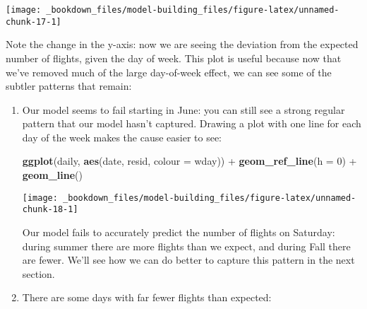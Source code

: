 \documentclass[]{book}
\newenvironment{Shaded}{\begin{snugshade}}{\end{snugshade}}
\newcommand{\KeywordTok}[1]{\textcolor[rgb]{0.13,0.29,0.53}{\textbf{{#1}}}}
\newcommand{\DataTypeTok}[1]{\textcolor[rgb]{0.13,0.29,0.53}{{#1}}}
\newcommand{\DecValTok}[1]{\textcolor[rgb]{0.00,0.00,0.81}{{#1}}}
\newcommand{\StringTok}[1]{\textcolor[rgb]{0.31,0.60,0.02}{{#1}}}
\newcommand{\CommentTok}[1]{\textcolor[rgb]{0.56,0.35,0.01}{\textit{{#1}}}}
\newcommand{\NormalTok}[1]{{#1}}
\begin{document}
\begin{center}\texttt{[image: \_bookdown\_files/model-building\_files/figure-latex/unnamed-chunk-17-1]} \end{center}

Note the change in the y-axis: now we are seeing the deviation from the
expected number of flights, given the day of week. This plot is useful
because now that we've removed much of the large day-of-week effect, we
can see some of the subtler patterns that remain:

\begin{enumerate}
\def\labelenumi{\arabic{enumi}.}
\item
  Our model seems to fail starting in June: you can still see a strong
  regular pattern that our model hasn't captured. Drawing a plot with
  one line for each day of the week makes the cause easier to see:

\begin{Shaded}
\begin{Highlighting}[]
\KeywordTok{ggplot}\NormalTok{(daily, }\KeywordTok{aes}\NormalTok{(date, resid, }\DataTypeTok{colour =} \NormalTok{wday)) +}\StringTok{ }
\StringTok{  }\KeywordTok{geom_ref_line}\NormalTok{(}\DataTypeTok{h =} \DecValTok{0}\NormalTok{) +}\StringTok{ }
\StringTok{  }\KeywordTok{geom_line}\NormalTok{()}
\end{Highlighting}
\end{Shaded}

  \begin{center}\texttt{[image: \_bookdown\_files/model-building\_files/figure-latex/unnamed-chunk-18-1]} \end{center}

  Our model fails to accurately predict the number of flights on
  Saturday: during summer there are more flights than we expect, and
  during Fall there are fewer. We'll see how we can do better to capture
  this pattern in the next section.
\item
  There are some days with far fewer flights than expected:

\begin{Shaded}
\end{Shaded}


\end{enumerate}
\end{document}
